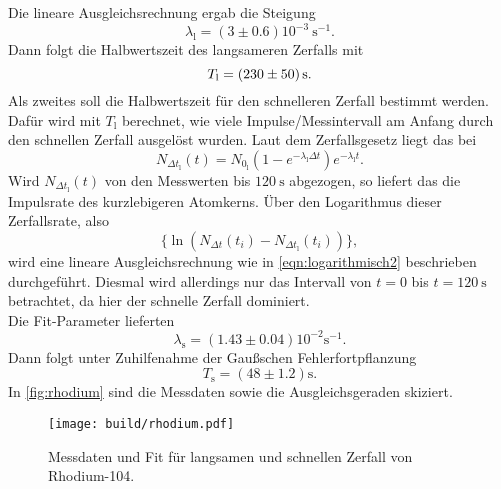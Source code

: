Die lineare Ausgleichsrechnung ergab die Steigung
\begin{equation}
	\lambda_\text{l} = (3 \pm 0.6) 10^{-3}\ \si{\second}^{-1}.
\end{equation}
\noindent Dann folgt die Halbwertszeit des langsameren Zerfalls mit
\begin{equation}
	T_\text{l} = \SI{230\pm50}{\second}.
\end{equation}
\noindent
Als zweites soll die Halbwertszeit für den schnelleren Zerfall bestimmt werden. Dafür wird mit
$T_\text{l}$ berechnet, wie viele Impulse/Messintervall am Anfang durch den schnellen Zerfall ausgelöst wurden.
Laut dem Zerfallsgesetz liegt das bei
\begin{equation}
	N_{\Delta t_\text{l}} (t) = N_{0_\text{l}} \left(1 - e^{-\lambda_\text{l}\Delta t}\right) 
	e^{-\lambda_\text{l}t }.
\end{equation}
\noindent
Wird $N_{\Delta t_\text{l}}(t)$ von den Messwerten bis $\SI{120}{\second}$ abgezogen, so liefert das
die Impulsrate des kurzlebigeren Atomkerns. Über den Logarithmus dieser Zerfallsrate, also
\begin{equation}
	\{ \ln(N_{\Delta t}(t_i) - N_{\Delta t_\text{l}} (t_i)) \},
\end{equation}
wird eine lineare Ausgleichsrechnung wie in \autoref{eqn:logarithmisch2} beschrieben durchgeführt. Diesmal
wird allerdings nur das Intervall von $t=0$ bis $t=\SI{120}{\second}$ betrachtet, da hier der schnelle 
Zerfall dominiert.
\\
Die Fit-Parameter lieferten
\begin{equation}
	\lambda_\text{s} = (1.43 \pm 0.04) 10^{-2} \si{\second}^{-1}.
\end{equation}
Dann folgt unter Zuhilfenahme der Gaußschen Fehlerfortpflanzung
\begin{equation}
	T_\text{s} = (48\pm1.2)\si{\second}.
\end{equation}
\noindent
In \autoref{fig:rhodium} sind die Messdaten sowie die Ausgleichsgeraden skiziert.
\begin{figure}[H]
	\centering
	\texttt{[image: build/rhodium.pdf]}
	\caption{Messdaten und Fit für langsamen und schnellen Zerfall von Rhodium-104.}
	\label{fig:rhodium}
\end{figure}
